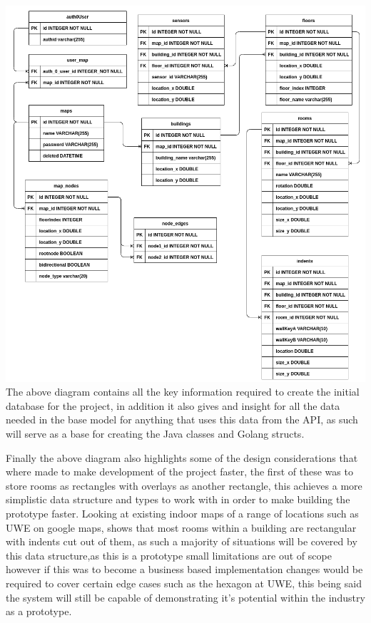\includegraphics[width=\linewidth]{./images/designs/erddetailed.png}\\
The above diagram contains all the key information required to create the initial database for the project, in addition it also gives and insight for all the data needed in the base model for anything that uses this data from the API, as such will serve as a base for creating the Java classes and Golang structs. 

Finally the above diagram also highlights some of the design considerations that where made to make development of the project faster, the first of these was to store rooms as rectangles with overlays as another rectangle, this achieves a more simplistic data structure and types to work with in order to make building the prototype faster. Looking at existing indoor maps of a range of locations such as UWE on google maps, shows that most rooms within a building are rectangular with indents cut out of them, as such a majority of situations will be covered by this data structure,as this is a prototype small limitations are out of scope however if this was to become a business based implementation changes would be required to cover certain edge cases such as the hexagon at UWE, this being said the system will still be capable of demonstrating it's potential within the industry as a prototype.

